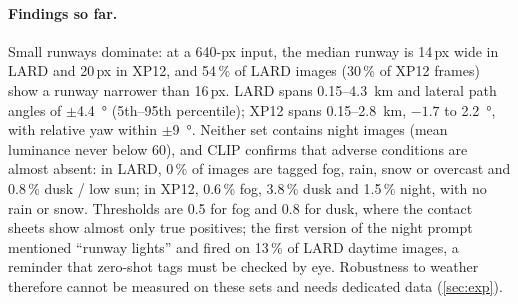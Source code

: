 \paragraph{Findings so far.}
Small runways dominate: at a 640-px input, the median runway is 14\,px wide in LARD and 20\,px in XP12, and 54\,\% of LARD images (30\,\% of XP12 frames) show a runway narrower than 16\,px.
LARD spans 0.15--\SI{4.3}{km} and lateral path angles of $\pm$\SI{4.4}{\degree} (5th--95th percentile); XP12 spans 0.15--\SI{2.8}{km}, $-1.7$ to \SI{2.2}{\degree}, with relative yaw within $\pm$\SI{9}{\degree}.
Neither set contains night images (mean luminance never below 60), and CLIP confirms that adverse conditions are almost absent: in LARD, 0\,\% of images are tagged fog, rain, snow or overcast and 0.8\,\% dusk / low sun; in XP12, 0.6\,\% fog, 3.8\,\% dusk and 1.5\,\% night, with no rain or snow.
Thresholds are 0.5 for fog and 0.8 for dusk, where the contact sheets show almost only true positives; the first version of the night prompt mentioned ``runway lights'' and fired on 13\,\% of LARD daytime images, a reminder that zero-shot tags must be checked by eye.
Robustness to weather therefore cannot be measured on these sets and needs dedicated data (\cref{sec:exp}).
